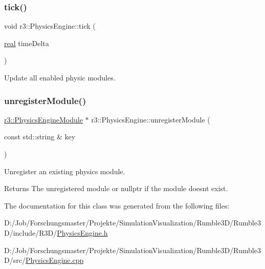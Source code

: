 \subsubsection{\texorpdfstring{tick()}{tick()}}
{\footnotesize\ttfamily void r3\+::\+Physics\+Engine\+::tick (\begin{DoxyParamCaption}\item[{\mbox{\hyperlink{namespacer3_ab2016b3e3f743fb735afce242f0dc1eb}{real}}}]{time\+Delta }\end{DoxyParamCaption})}



Update all enabled physic modules. 

\mbox{\label{classr3_1_1_physics_engine_a54dfdfda1b3f7eb33e9603d247f45aa8}} 
\subsubsection{\texorpdfstring{unregister\+Module()}{unregisterModule()}}
{\footnotesize\ttfamily \mbox{\hyperlink{classr3_1_1_physics_engine_module}{r3\+::\+Physics\+Engine\+Module}} $\ast$ r3\+::\+Physics\+Engine\+::unregister\+Module (\begin{DoxyParamCaption}\item[{const std\+::string \&}]{key }\end{DoxyParamCaption})}



Unregister an existing physics module. 

\begin{DoxyReturn}{Returns}
The unregistered module or nullptr if the module doesn\textquotesingle{}t exist. 
\end{DoxyReturn}


The documentation for this class was generated from the following files\+:\begin{DoxyCompactItemize}
\item 
D\+:/\+Job/\+Forschungsmaster/\+Projekte/\+Simulation\+Visualization/\+Rumble3\+D/\+Rumble3\+D/include/\+R3\+D/\mbox{\hyperlink{_physics_engine_8h}{Physics\+Engine.\+h}}\item 
D\+:/\+Job/\+Forschungsmaster/\+Projekte/\+Simulation\+Visualization/\+Rumble3\+D/\+Rumble3\+D/src/\mbox{\hyperlink{_physics_engine_8cpp}{Physics\+Engine.\+cpp}}\end{DoxyCompactItemize}
